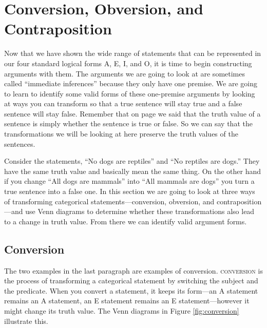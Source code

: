 
\section{Conversion, Obversion, and Contraposition}\label{sec:conv_obv_cont}

Now that we have shown the wide range of statements that can be represented in our four standard logical forms A, E, I, and O, it is time to begin constructing arguments with them. The arguments we are going to look at are sometimes called ``immediate inferences'' because they only have one premise. We are going to learn to identify some valid forms of these one-premise arguments by looking at ways you can transform so that a true sentence will stay true and a false sentence will stay false. Remember that on page \pageref{def:Truth_value} we said that the \gls{truth value} of a sentence is simply whether the sentence is true or false. So we can say that the transformations we will be looking at here preserve the truth values of the sentences.

Consider the statements, ``No dogs are reptiles'' and ``No reptiles are dogs.'' They have the same truth value and basically mean the same thing. On the other hand if you change ``All dogs are mammals'' into ``All mammals are dogs'' you turn a true sentence into a false one. In this section we are going to look at three ways of transforming categorical statements---conversion, obversion, and contraposition---and use Venn diagrams to determine whether these transformations also lead to a change in truth value. From there we can identify valid argument forms.

\subsection{Conversion}

The two examples in the last paragraph are examples of conversion. \textsc{\gls{conversion}} \label{def:conversion} is the process of transforming a categorical statement by switching the subject and the predicate. When you convert a statement, it keeps its form---an A statement remains an A statement, an E statement remains an E statement---however it might change its truth value.  The Venn diagrams in Figure \ref{fig:conversion} illustrate this.

